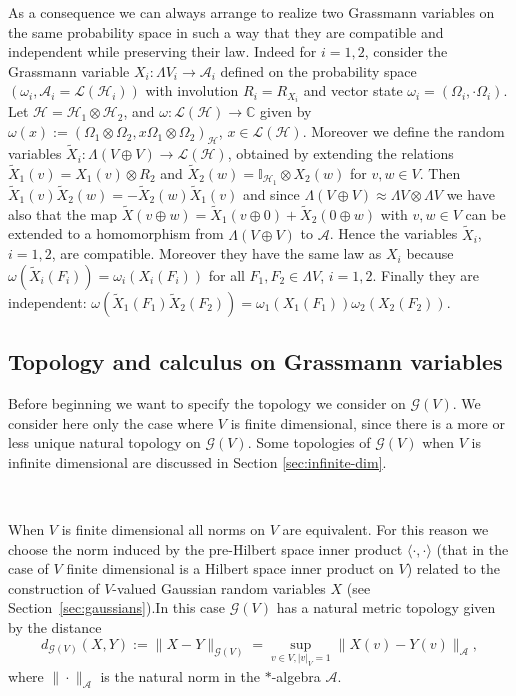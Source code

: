 \documentclass{article}
\newcommand{\assign}{:=}
\newcommand{\asterisk}{\mathord{*}}
\begin{document}
As a consequence we can always arrange to realize two Grassmann variables on
the same probability space in such a way that they are compatible and
independent while preserving their law. Indeed for $i = 1, 2$, consider the
Grassmann variable $X_i : \Lambda V_i \rightarrow \mathcal{A}_i$ defined on
the probability space $(\omega_i, \mathcal{A}_i =\mathcal{L} (\mathcal{H}_i))$
with involution $R_i = R_{X_i}$ and vector state $\omega_i = (\Omega_i, \cdot
\Omega_i)$. Let $\mathcal{H}=\mathcal{H}_1 \otimes \mathcal{H}_2$, and $\omega
: \mathcal{L} (\mathcal{H}) \rightarrow \mathbb{C}$ given by $\omega (x)
\assign (\Omega_1 \otimes \Omega_2, x \Omega_1 \otimes
\Omega_2)_{\mathcal{H}}$, $x \in \mathcal{L} (\mathcal{H})$. Moreover we
define the random variables $\tilde{X}_i : \Lambda (V \oplus V) \rightarrow
\mathcal{L} (\mathcal{H})$, obtained by extending the relations $\tilde{X}_1
(v) = X_1 (v) \otimes R_2$ and $\tilde{X}_2 (w) =\mathbb{I}_{\mathcal{H}_1}
\otimes X_2 (w)$ for $v, w \in V$. Then $\tilde{X}_1 (v) \tilde{X}_2 (w) = -
\tilde{X}_2 (w) \tilde{X}_1 (v)$ and since $\Lambda (V \oplus V) \approx
\Lambda V \otimes \Lambda V$ we have also that the map $\tilde{X} (v \oplus w)
= \tilde{X}_1 (v \oplus 0) + \tilde{X}_2 (0 \oplus w)$ with $v, w \in V$ can
be extended to a homomorphism from $\Lambda (V \oplus V)$ to $\mathcal{A}$.
Hence the variables $\tilde{X}_i$, $i = 1, 2$, are compatible. Moreover they
have the same law as $X_i$ because $\omega (\tilde{X}_i (F_i)) = \omega_i (X_i
(F_i))$ for all $F_1, F_2 \in \Lambda V$, $i = 1, 2$. Finally they are
independent: $\omega (\tilde{X}_1 (F_1) \tilde{X}_2 (F_2)) = \omega_1 (X_1
(F_1)) \omega_2 (X_2 (F_2))$.

\subsection{Topology and calculus on Grassmann variables}\label{sec:top}

Before beginning we want to specify the topology we consider on $\mathcal{G}
(V)$. We consider here only the case where $V$ is finite dimensional, since
there is a more or less unique natural topology on $\mathcal{G} (V)$. Some
topologies of $\mathcal{G} (V)$ when $V$ is infinite dimensional are discussed
in Section \ref{sec:infinite-dim}.

\

When $V$ is finite dimensional all norms on $V$ are equivalent. For this
reason we choose the norm induced by the pre-Hilbert space inner product
$\langle \cdot, \cdot \rangle$ (that in the case of $V$ finite dimensional is
a Hilbert space inner product on $V$) related to the construction of
$V$-valued Gaussian random variables $X$ (see
Section~\ref{sec:gaussians}).\quad In this case $\mathcal{G} (V)$ has a
natural metric topology given by the distance
\begin{equation}
  d_{\mathcal{G} (V)} (X, Y) \assign \| X - Y \|_{\mathcal{G} (V)} = \sup_{v
  \in V, | v |_V = 1} \| X (v) - Y (v) \|_{\mathcal{A}},
  \label{eq:distrance-g}
\end{equation}
where $\| \cdot \|_{\mathcal{A}}$ is the natural norm in the
$\asterisk$-algebra $\mathcal{A}$.
\end{document}
